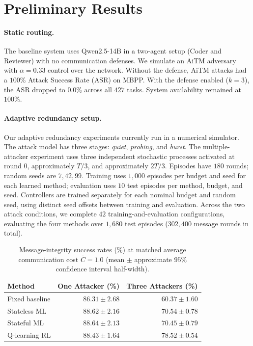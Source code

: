 \documentclass{article}
\begin{document}
\section{Preliminary Results}
\paragraph{Static routing.}
The baseline system uses Qwen2.5-14B in a two-agent setup (Coder and Reviewer) with no communication defenses. We simulate an {AiTM} adversary with $\alpha = 0.33$ control over the network. Without the defense, {AiTM} attacks had a $100\%$ Attack Success Rate ({ASR}) on MBPP. With the defense enabled ($k=3$), the {ASR} dropped to $0.0\%$ across all $427$ tasks. System availability remained at $100\%$.

\paragraph{Adaptive redundancy setup.}
Our adaptive redundancy experiments currently run in a numerical simulator. The attack model has three stages: \emph{quiet}, \emph{probing}, and \emph{burst}. The multiple-attacker experiment uses three independent stochastic processes activated at round $0$, approximately $T/3$, and approximately $2T/3$. Episodes have $180$ rounds; random seeds are $7, 42, 99$. Training uses $1{,}000$ episodes per budget and seed for each learned method; evaluation uses $10$ test episodes per method, budget, and seed. Controllers are trained separately for each nominal budget and random seed, using distinct seed offsets between training and evaluation. Across the two attack conditions, we complete $42$ training-and-evaluation configurations, evaluating the four methods over $1{,}680$ test episodes ($302{,}400$ message rounds in total).

\begin{table}[t]
\centering
\small
\caption{Message-integrity success rates (\%) at matched average communication cost $\bar{C} = 1.0$ (mean $\pm$ approximate $95\%$ confidence interval half-width).}
\label{tab:matched_cost}
\begin{tabular}{lrr}
\toprule
\textbf{Method} & \textbf{One Attacker (\%)} & \textbf{Three Attackers (\%)} \\
\midrule
Fixed baseline & $86.31 \pm 2.68$ & $60.37 \pm 1.60$ \\
Stateless {ML} & $88.62 \pm 2.16$ & $70.54 \pm 0.78$ \\
Stateful {ML}  & $\mathbf{88.64 \pm 2.13}$ & $70.45 \pm 0.79$ \\
Q-learning {RL} & $88.43 \pm 1.64$ & $\mathbf{78.52 \pm 0.54}$ \\
\bottomrule
\end{tabular}
\end{table}
\end{document}
